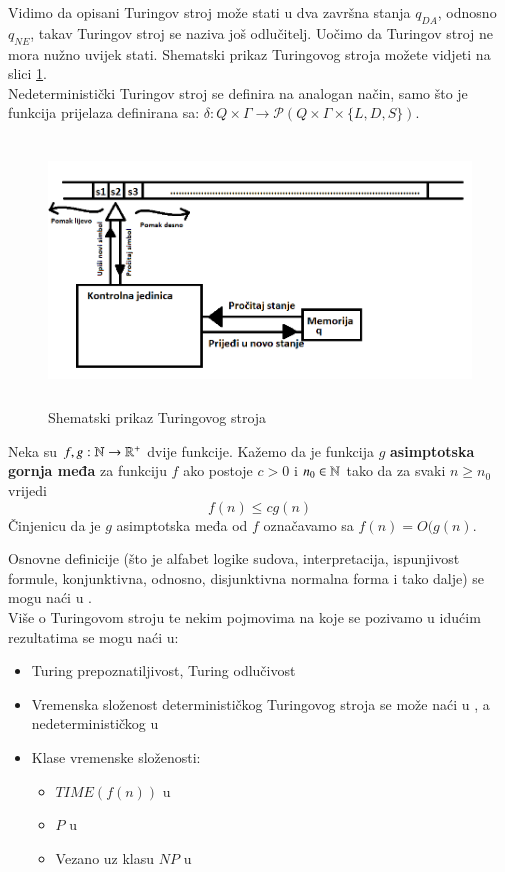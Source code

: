 \documentclass[a4paper,oneside,12pt]{memoir} %
\begin{document}
\begin{spacing}{1.5}
\begin{rem}
Vidimo da opisani Turingov stroj može stati u dva završna stanja $q_{DA}$, odnosno $q_{NE}$, takav Turingov stroj se naziva još odlučitelj. Uočimo da Turingov stroj ne mora nužno uvijek stati. Shematski prikaz Turingovog stroja možete vidjeti na slici \ref{fig:Turing}.\\
Nedeterministički Turingov stroj se definira na analogan način, samo što je funkcija prijelaza definirana sa: $\delta : Q \times \Gamma \to \mathcal{P}(Q \times \Gamma \times \{L,D,S\})$. 
\end{rem}
\begin{figure}[h!t]
\centering \includegraphics[height=200pt, width=400pt]{Turing.png}
\caption{Shematski prikaz Turingovog stroja}
\label{fig:Turing}
\end{figure} 
\begin{defn}
Neka su $f, g: \mathbb{N} \to \mathbb{R}^{+}$ dvije funkcije. Kažemo da je funkcija $g$ \textbf{asimptotska gornja međa} za funkciju $f$ ako postoje $c>0$ i $n_0 \in \mathbb{N}$ tako da za svaki $n \geq n_0$ vrijedi
\[f(n)\leq cg(n)\]
Činjenicu da je $g$ asimptotska međa od $f$ označavamo sa $f(n)=O(g(n)$. 
\end{defn}
Osnovne definicije (što je alfabet logike sudova, interpretacija, ispunjivost formule, konjunktivna, odnosno, disjunktivna normalna forma  i tako dalje) se mogu naći u \cite[str. ~12-25]{Vukovic}.\\
Više o Turingovom stroju te nekim pojmovima na koje se pozivamo u idućim rezultatima se mogu naći u:
\begin{itemize}
\item Turing prepoznatiljivost, Turing odlučivost \cite[str. ~141-142]{Sipser}
\item Vremenska složenost determinističkog Turingovog stroja se može naći u \cite[str. ~248]{Sipser}, a nedeterminističkog u \cite[str. ~255]{Sipser}
\item Klase vremenske složenosti:
 \begin{itemize}
 	\item $TIME(f(n))$ u \cite[str. ~251]{Sipser}
 	\item $P$  u \cite[str. ~258]{Sipser}
 	\item Vezano uz klasu $NP$ u \cite[str. ~265-267]{Sipser}
 \end{itemize}
 

\end{itemize}
\end{spacing}
\end{document}

